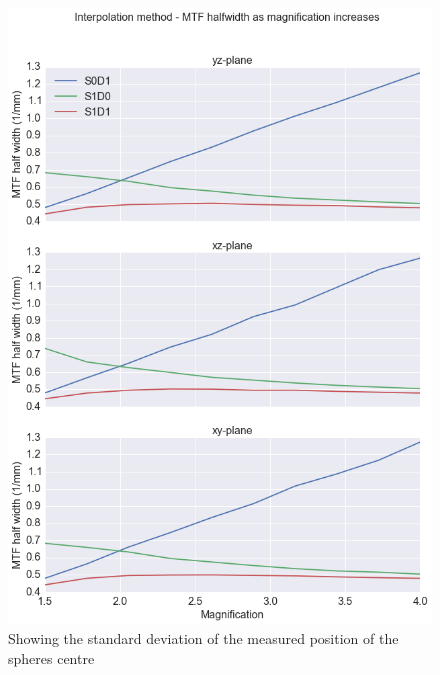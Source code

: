 \documentclass[
  twoside,
  11pt, a4paper,
  footinclude=true,
  headinclude=true,
  cleardoublepage=empty
]{scrbook}
\begin{document}
\begin{figure}[h!]
  \centering
    \includegraphics[width=\textwidth]{figures/interpmtf.png}
    \caption{Showing the standard deviation of the measured position of the spheres centre}
        \label{interpmtf}
\end{figure}
\end{document}
